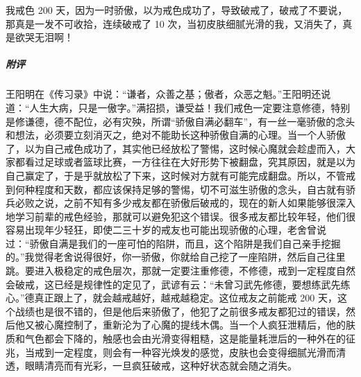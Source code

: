 \begin{case}
    我戒色 200 天，因为一时骄傲，以为戒色成功了，导致破戒了，破戒了不要说，那真是一发不可收拾，连续破戒了 10 次，当初皮肤细腻光滑的我，又消失了，真是欲哭无泪啊！
    \subparagraph{附评} 王阳明在《传习录》中说：“谦者，众善之基；傲者，众恶之魁。”王阳明还说道：“人生大病，只是一傲字。”满招损，谦受益！我们戒色一定要注意修德，特别是修谦德，德不配位，必有灾殃，所谓“骄傲自满必翻车”，有一丝一毫骄傲的念头和想法，必须要立刻消灭之，绝对不能助长这种骄傲自满的心理。当一个人骄傲了，以为自己戒色成功了，其实他已经放松了警惕，这时候心魔就会趁虚而入，大家都看过足球或者篮球比赛，一方往往在大好形势下被翻盘，究其原因，就是以为自己赢定了，于是乎就放松了下来，这时候对方就有可能完成翻盘。所以，不管戒到何种程度和天数，都应该保持足够的警惕，切不可滋生骄傲的念头，自古就有骄兵必败之说，之前不知有多少戒友都在骄傲后破戒的，现在的新人如果能够很深入地学习前辈的戒色经验，那就可以避免犯这个错误。很多戒友都比较年轻，他们很容易出现年少轻狂，即使二三十岁的戒友也可能出现骄傲的心理，老舍曾说过：“骄傲自满是我们的一座可怕的陷阱，而且，这个陷阱是我们自己亲手挖掘的。”我觉得老舍说得很好，你一骄傲，你就给自己挖了一座陷阱，然后自己往里跳。要进入极稳定的戒色层次，那就一定要注重修德，不修德，戒到一定程度自然会破戒，这已经是规律性的定见了，武谚有云：“未曾习武先修德，要想练武先练心。”德真正跟上了，就会越戒越好，越戒越稳定。这位戒友之前能戒 200 天，这个战绩也是很不错的，但是他后来骄傲了，他犯了之前很多戒友都犯过的错误，然后他又被心魔控制了，重新沦为了心魔的提线木偶。当一个人疯狂泄精后，他的肤质和气色都会下降的，触感也会由光滑变得粗糙，这是能量耗泄后的一种外在的征兆，当戒到一定程度，则会有一种容光焕发的感觉，皮肤也会变得细腻光滑而清透，眼睛清亮而有光彩，一旦疯狂破戒，这种好状态就会随之消失。
\end{case}

